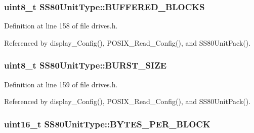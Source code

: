 \subsubsection[{\texorpdfstring{B\+U\+F\+F\+E\+R\+E\+D\+\_\+\+B\+L\+O\+C\+KS}{BUFFERED_BLOCKS}}]{\setlength{\rightskip}{0pt plus 5cm}uint8\+\_\+t S\+S80\+Unit\+Type\+::\+B\+U\+F\+F\+E\+R\+E\+D\+\_\+\+B\+L\+O\+C\+KS}\hypertarget{structSS80UnitType_a575a381fe873ba8ba9aa4630673516a4}{}\label{structSS80UnitType_a575a381fe873ba8ba9aa4630673516a4}


Definition at line 158 of file drives.\+h.



Referenced by display\+\_\+\+Config(), P\+O\+S\+I\+X\+\_\+\+Read\+\_\+\+Config(), and S\+S80\+Unit\+Pack().

\subsubsection[{\texorpdfstring{B\+U\+R\+S\+T\+\_\+\+S\+I\+ZE}{BURST_SIZE}}]{\setlength{\rightskip}{0pt plus 5cm}uint8\+\_\+t S\+S80\+Unit\+Type\+::\+B\+U\+R\+S\+T\+\_\+\+S\+I\+ZE}\hypertarget{structSS80UnitType_a4bc66bc02c06dbfe279be6d2af808a04}{}\label{structSS80UnitType_a4bc66bc02c06dbfe279be6d2af808a04}


Definition at line 159 of file drives.\+h.



Referenced by display\+\_\+\+Config(), P\+O\+S\+I\+X\+\_\+\+Read\+\_\+\+Config(), and S\+S80\+Unit\+Pack().

\subsubsection[{\texorpdfstring{B\+Y\+T\+E\+S\+\_\+\+P\+E\+R\+\_\+\+B\+L\+O\+CK}{BYTES_PER_BLOCK}}]{\setlength{\rightskip}{0pt plus 5cm}uint16\+\_\+t S\+S80\+Unit\+Type\+::\+B\+Y\+T\+E\+S\+\_\+\+P\+E\+R\+\_\+\+B\+L\+O\+CK}\hypertarget{structSS80UnitType_a18a5f03be6bea14c6c4a1f9b952bb160}{}\label{structSS80UnitType_a18a5f03be6bea14c6c4a1f9b952bb160}



